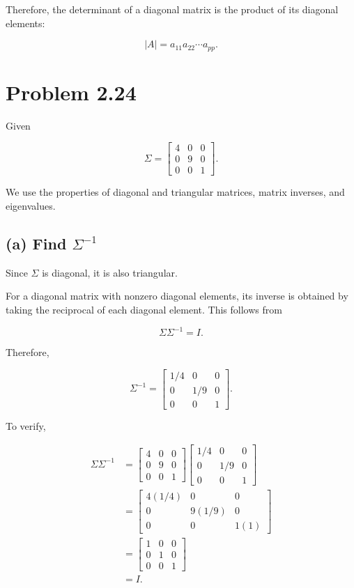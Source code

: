 \documentclass[12pt]{article}
\begin{document}
	Therefore, the determinant of a diagonal matrix is the product
	of its diagonal elements:
	
	\[
	\boxed{
		|A|=a_{11}a_{22}\cdots a_{pp}
	}.
	\]
	
	\section*{Problem 2.24}
	
	Given
	
	\[
	\Sigma=
	\begin{bmatrix}
		4&0&0\\
		0&9&0\\
		0&0&1
	\end{bmatrix}.
	\]
	
	We use the properties of diagonal and triangular matrices,
	matrix inverses, and eigenvalues.
	
	\subsection*{(a) Find $\Sigma^{-1}$}
	
	Since $\Sigma$ is diagonal, it is also triangular.
	
	For a diagonal matrix with nonzero diagonal elements, its inverse
	is obtained by taking the reciprocal of each diagonal element.
	This follows from
	
	\[
	\Sigma\Sigma^{-1}=I.
	\]
	
	Therefore,
	
	\[
	\boxed{
		\Sigma^{-1}
		=
		\begin{bmatrix}
			1/4&0&0\\
			0&1/9&0\\
			0&0&1
		\end{bmatrix}
	}.
	\]
	
	To verify,
	
	\[
	\begin{aligned}
		\Sigma\Sigma^{-1}
		&=
		\begin{bmatrix}
			4&0&0\\
			0&9&0\\
			0&0&1
		\end{bmatrix}
		\begin{bmatrix}
			1/4&0&0\\
			0&1/9&0\\
			0&0&1
		\end{bmatrix}\\
		&=
		\begin{bmatrix}
			4(1/4)&0&0\\
			0&9(1/9)&0\\
			0&0&1(1)
		\end{bmatrix}\\
		&=
		\begin{bmatrix}
			1&0&0\\
			0&1&0\\
			0&0&1
		\end{bmatrix}\\
		&=I.
	\end{aligned}
	\]
	
\end{document}
